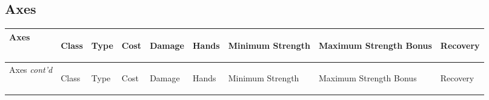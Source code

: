 \documentclass[twoside]{book}
\begin{document}
    

\subsection{Axes}
    
\begin{longtable}{p{1.25in}llllp{2em}p{3em}p{3em}l} 
  Axes& \begin{turn}{70}{Class}\end{turn}
          & \begin{turn}{70}{Type}\end{turn}
          & \begin{turn}{70}{Cost}\end{turn}
          & \begin{turn}{70}{Damage}\end{turn}
          & \begin{turn}{70}{Hands}\end{turn}
          & \begin{turn}{70}{Minimum Strength}\end{turn}
          & \begin{turn}{70}{Maximum Strength Bonus}\end{turn}
          & \begin{turn}{70}{Recovery}\end{turn}
          \\
  \hline
  \hline
  \endfirsthead
  Axes \textit{cont'd}
        & \begin{turn}{70}{Class}\end{turn}
          & \begin{turn}{70}{Type}\end{turn}
          & \begin{turn}{70}{Cost}\end{turn}
          & \begin{turn}{70}{Damage}\end{turn}
          & \begin{turn}{70}{Hands}\end{turn}
          & \begin{turn}{70}{Minimum Strength}\end{turn}
          & \begin{turn}{70}{Maximum Strength Bonus}\end{turn}
          & \begin{turn}{70}{Recovery}\end{turn}
           \\
  \hline

\end{longtable}
\end{document}
